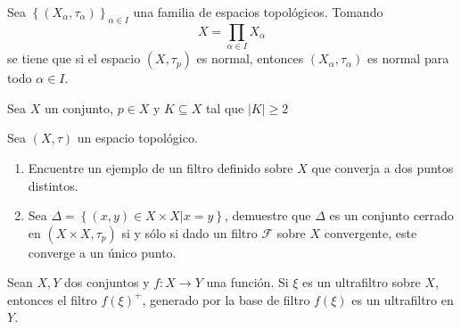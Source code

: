 \documentclass[12pt]{report}
\theoremstyle{largebreak}
\newcommand\abs[1]{\ensuremath{\left|#1\right|}}
\newcommand\cf[3]{\ensuremath{#1:#2\rightarrow#3}}
\begin{document}
    \begin{excer}
        Sea $\left\{(X_\alpha,\tau_\alpha) \right\}_{\alpha\in I}$ una familia de espacios topológicos. Tomando
        \begin{equation*}
            X=\prod_{\alpha\in I}X_\alpha
        \end{equation*}
        se tiene que si el espacio $(X,\tau_p)$ es normal, entonces $(X_\alpha,\tau_\alpha)$ es normal para todo $\alpha\in I$. 
    \end{excer}

    \begin{excer}
        Sea $X$ un conjunto, $p\in X$ y $K\subseteq X$ tal que $\abs{K}\geq2$
    \end{excer}

    \begin{excer}
        Sea $(X,\tau)$ un espacio topológico.
        \begin{enumerate}
            \item Encuentre un ejemplo de un filtro definido sobre $X$ que converja a dos puntos distintos.
            \item Sea $\Delta=\left\{(x,y)\in X\times X\Big|x=y \right\}$, demuestre que $\Delta$ es un conjunto cerrado en $(X\times X,\tau_p)$ si y sólo si dado un filtro $\mathcal{F}$ sobre $X$ convergente, este converge a un único punto.
        \end{enumerate}
    \end{excer}

    \begin{excer}
        Sean $X,Y$ dos conjuntos y $\cf{f}{X}{Y}$ una función. Si $\xi$ es un ultrafiltro sobre $X$, entonces el filtro $f(\xi)^+$, generado por la base de filtro $f(\xi)$ es un ultrafiltro en $Y$.
    \end{excer}
\end{document}
